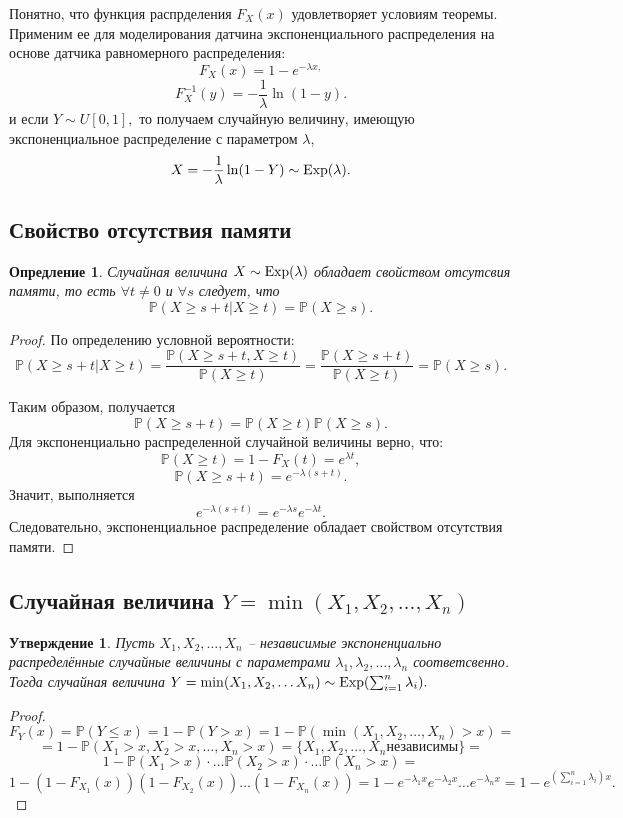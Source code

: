 \documentclass[11pt]{article}
\newtheorem{definition}{Опредление}
\newtheorem{statement}{Утверждение}
\newtheorem{proof}{Доказательство}
\newcommand{\expon}{\normalfont{\text{Exp}}}
\numberwithin{equation}{section}
\begin{document}
Понятно, что функция распрделения $F_X(x)$ удовлетворяет условиям теоремы. Применим ее для моделирования датчина экспоненциального распределения на основе датчика равномерного распределения:
$$F_X(x)=1-e^{-\lambda x,}$$
$$ F_X^{-1}(y)=-\frac{1}{\lambda}\ln(1-y).$$
и если $Y \sim U[0,1],$ то получаем случайную величину, имеющую экспоненциальное распределение с параметром $\lambda$,
$$ X=-\frac{1}{\lambda}\ln(1-Y) \sim \expon(\lambda). $$
\subsection{Свойство отсутствия памяти}
\begin{definition}
  Случайная величина $X \sim \expon(\lambda)$ обладает свойством отсутсвия памяти, то есть
  $\forall t \not = 0$ и $\forall s$ следует, что 
  $$ \mathbb{P}(X \geq s+t | X \geq t) = \mathbb{P}(X \geq s).$$
\end{definition}
\begin{proof}
  По определению условной вероятности:
  $$\mathbb{P}(X \geq s+t|X \geq t) = \frac{ \mathbb{P} (X \geq s+t, X \geq t) }{ \mathbb{P} (X\geq t)} = \frac{\mathbb{P} (X \geq s+t)}{ \mathbb{P} (X \geq t)} = \mathbb{P}(X \geq s).$$

  Таким образом, получается 
  $$\mathbb{P}(X \geq s+t) = \mathbb{P}(X \geq t)\mathbb{P}(X \geq s).$$
  Для экспоненциально распределенной случайной величины верно, что:
  $$ \mathbb{P}(X\geq t) = 1 - F_X(t) = e^{\lambda t},$$
  $$ \mathbb{P}(X \geq s+t) = e^{-\lambda(s+t)}.$$
  Значит, выполняется 
  $$ e^{-\lambda(s+t)}=e^{-\lambda s} e^{-\lambda t}.$$
  Следовательно, экспоненциальное распределение обладает свойством отсутствия памяти.
\end{proof}
\subsection{Случайная величина $Y = \min(X_1,X_2, \dots,X_n)$}
\begin{statement}
  Пусть $X_1, X_2, \dots, X_n$ -- независимые экспоненциально распределённые
  случайные величины с параметрами $\lambda_1, \lambda_2, \dots, \lambda_n$ соответсвенно. Тогда случайная величина
  $Y = \min(X_1, X_2, \dots X_n) \sim \expon(\sum_{i=1}^n \lambda_i).$
\end{statement}
\begin{proof}
  $$F_Y(x) = \mathbb{P}(Y \leq x) = 1 - \mathbb{P}(Y>x) = 1 - \mathbb{P}(\min(X_1,X_2, \dots, X_n)>x)=$$
  $$ = 1 - \mathbb{P}(X_1>x, X_2>x, \dots,X_n>x) = \{X_1,X_2, \dots, X_n \text{независимы} \}=$$
  $$ 1- \mathbb{P}(X_1 > x) \cdot \dots \mathbb{P}(X_2>x) \cdot \dots \mathbb{P}(X_n>x)=$$
  $$ 1-(1-F_{X_1}(x))(1-F_{X_2}(x))\dots (1-F_{X_n}(x)) = 1 - e^{-\lambda_1 x} e^{-\lambda_2 x} \dots e^{-\lambda_n x} = 1 - e^{(\sum_{i=1}^{n}\lambda_i)x}.$$
\end{proof}
\end{document}
